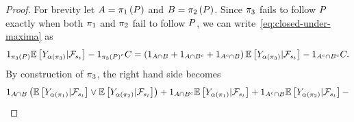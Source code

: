 \begin{proof}
    For brevity let 
    \(
        A=
        \pi_1\left(P\right)
    \)
    and 
    \(
        B=
        \pi_2\left(P\right)
    \).
    Since $\pi_3$ fails to follow $P$ exactly when
    both $\pi_1$ and $\pi_2$ fail to follow 
    $P$, we can write~\eqref{eq:closed-under-maxima} as 
    \begin{align*}
        1_{
            \pi_3\left(P\right)
        }
        \mathbb{E}\left[
            Y_{
                \alpha\left(
                    \pi_3
                \right)
            }
            | \mathcal{F}_{s_{t}}
        \right]
        -
        1_{
            \pi_3\left(P\right)^c
        }
        C
        =
        \left(
            1_{
                A\cap B
            }
            +
            1_{
                A\cap B^c
            }
            +
            1_{
                A^c\cap B
            }
        \right)
        \mathbb{E}\left[
            Y_{
                \alpha\left(
                    \pi_3
                \right)
            }
            | \mathcal{F}_{s_{t}}
        \right]
        -
        1_{
            A^c\cap B^c
        }
        C .
    \end{align*}   
    By construction of $\pi_3$, the right hand side becomes
    \begin{gather*}
        1_{
            A\cap B
        }
        \rbr{
            \EE\sbr{
                \rewardss{
                    \stopstateforpolicy{
                        \exchangepolicy_1
                    }
                }
                | \statefiltss{\exchanget}
            }
            \vee
            \EE\sbr{
                \rewardss{
                    \stopstateforpolicy{
                        \exchangepolicy_2
                    }
                }
                | \statefiltss{\exchanget}
            }
        }
        +
        1_{
            A\cap B^c
        }
        \EE\sbr{
            \rewardss{
                \stopstateforpolicy{
                    \exchangepolicy_1
                }
            }
            | \statefiltss{\exchanget}
        }
        +
        1_{
            A^c\cap B
        }
        \EE\sbr{
            \rewardss{
                \stopstateforpolicy{
                    \exchangepolicy_2
                }
            }
            | \statefiltss{\exchanget}
        }
        -

\end{gather*}
\end{proof}
